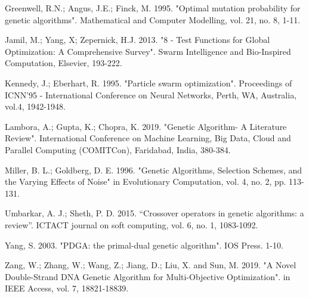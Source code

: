 \documentclass[runningheads]{llncs}
\begin{document}
\begin{thebibliography}{8}

 Greenwell, R.N.; Angus, J.E.; Finck, M. 1995. "Optimal mutation probability for genetic algorithms". Mathematical and Computer Modelling, vol. 21, no. 8, 1-11.

 Jamil, M.; Yang, X; Zepernick, H.J. 2013. "8 - Test Functions for Global Optimization: A Comprehensive Survey". Swarm Intelligence and Bio-Inspired Computation, Elsevier, 193-222.

 Kennedy, J.; Eberhart, R. 1995. "Particle swarm optimization". Proceedings of ICNN'95 - International Conference on Neural Networks, Perth, WA, Australia, vol.4, 1942-1948.

 Lambora, A.; Gupta, K.; Chopra, K. 2019. "Genetic Algorithm- A Literature Review". International Conference on Machine Learning, Big Data, Cloud and Parallel Computing (COMITCon), Faridabad, India, 380-384.

 Miller, B. L.; Goldberg, D. E. 1996. "Genetic Algorithms, Selection Schemes, and the Varying Effects of Noise" in Evolutionary Computation, vol. 4, no. 2, pp. 113-131.

 Umbarkar, A. J.; Sheth, P. D. 2015. “Crossover operators in genetic algorithms: a review”. ICTACT journal on soft computing, vol. 6, no. 1, 1083-1092.

 Yang, S. 2003. "PDGA: the primal-dual genetic algorithm". IOS Press. 1-10.

 Zang, W.; Zhang, W.; Wang, Z.; Jiang, D.; Liu, X. and Sun, M. 2019. "A Novel Double-Strand DNA Genetic Algorithm for Multi-Objective Optimization". in IEEE Access, vol. 7, 18821-18839.

\end{thebibliography}
\end{document}
